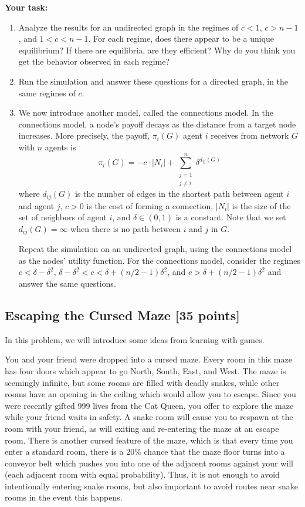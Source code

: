 \documentclass[11pt]{article}
\begin{document}
\vspace{.1in}
\noindent \textbf{Your task:}
\begin{enumerate}
\item Analyze the results for an undirected graph in the regimes of $c < 1$, $c > n-1$, and $1 < c < n-1$. For each regime, does there appear to be a unique equilibrium? If there are equilibria, are they efficient? Why do you think you get the behavior observed in each regime?

\item Run the simulation and answer these questions for a directed graph, in the same regimes of $c$.

\item We now introduce another model, called the connections model. In the connections model, a node's payoff decays as the distance from a target node increases. More precisely, the payoff, $\pi_i(G)$ agent $i$ receives from network $G$ with $n$ agents is $$\pi_i(G)= - c \cdot | N_i | + \sum_{\substack{j=1 \\ j\neq i}}^{n} \delta^{d_{ij}(G)}$$
where $d_{ij}(G)$ is the number of edges in the shortest path between agent $i$ and agent $j$, $c > 0$ is the cost of forming a connection, $|N_i|$ is the size of the set of neighbors of agent $i$, and $\delta\in(0,1)$ is a constant.  Note that we set $d_{ij}(G)=\infty$ when there is no path between $i$ and $j$ in $G$. 

Repeat the simulation on an undirected graph, using the connections model as the nodes' utility function. For the connections model, consider the regimes $c < \delta - \delta^2$, $\delta - \delta^2 < c < \delta + (n/2-1)\delta^2$, and $c > \delta + (n/2-1)\delta^2$ and answer the same questions.


\end{enumerate}
\newpage
\subsection{Escaping the Cursed Maze [35 points]}

In this problem, we will introduce some ideas from learning with games. 

You and your friend were dropped into a cursed maze. Every room in this maze has four doors which appear to go North, South, East, and West. The maze is seemingly infinite, but some rooms are filled with deadly snakes, while other rooms have an opening in the ceiling which would allow you to escape. Since you were recently gifted 999 lives from the Cat Queen, you offer to explore the maze while your friend waits in safety. A snake room will cause you to respawn at the room with your friend, as will exiting and re-entering the maze at an escape room. There is another cursed feature of the maze, which is that every time you enter a standard room, there is a $20\%$ chance that the maze floor turns into a conveyor belt which pushes you into one of the adjacent rooms against your will (each adjacent room with equal probability). Thus, it is not enough to avoid intentionally entering snake rooms, but also important to avoid routes near snake rooms in the event this happens. 
\end{document}
